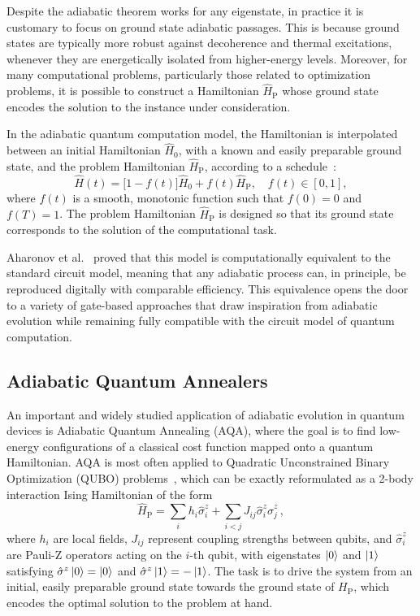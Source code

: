 Despite the adiabatic theorem works for any eigenstate, in practice it is customary to focus on ground state adiabatic passages. This is because ground states are typically more robust against decoherence and thermal excitations, whenever they are energetically isolated from higher-energy levels. Moreover, for many computational problems, particularly those related to optimization problems, it is possible to construct a Hamiltonian $\hat{H}_\mathrm{P}$ whose ground state encodes the solution to the instance under consideration.

In the adiabatic quantum computation model, the Hamiltonian is interpolated between an initial Hamiltonian $\hat{H}_0$, with a known and easily preparable ground state, and the problem Hamiltonian $\hat{H}_\mathrm{P}$, according to a schedule~\cite{albash_adiabatic_2018}:
\begin{equation}
    \hat{H}(t) = \big[1 - f(t)\big] \hat{H}_0 + f(t) \hat{H}_\mathrm{P}, \quad f(t) \in [0,1],
    \label{eq:adiabatic_passage}
\end{equation}
where $f(t)$ is a smooth, monotonic function such that $f(0)=0$ and $f(T)=1$. The problem Hamiltonian $\hat{H}_\mathrm{P}$ is designed so that its ground state corresponds to the solution of the computational task.

Aharonov et al.~\cite{aharonov_adiabatic_2004} proved that this model is computationally equivalent to the standard circuit model, meaning that any adiabatic process can, in principle, be reproduced digitally with comparable efficiency. This equivalence opens the door to a variety of gate-based approaches that draw inspiration from adiabatic evolution while remaining fully compatible with the circuit model of quantum computation.

\subsection{Adiabatic Quantum Annealers}
An important and widely studied application of adiabatic evolution in quantum devices is Adiabatic Quantum Annealing (AQA), where the goal is to find low-energy configurations of a classical cost function mapped onto a quantum Hamiltonian. AQA is most often applied to Quadratic Unconstrained Binary Optimization (QUBO) problems~\cite{kadowaki_quantum_1998}, which can be exactly reformulated as a 2-body interaction Ising Hamiltonian of the form~\cite{albash_adiabatic_2018}
\begin{equation}
    \hat{H}_\mathrm{P} = \sum_i h_i \hat{\sigma}_i^z + \sum_{i<j} J_{ij} \hat{\sigma}_i^z \hat{\sigma}_j^z\,,
    \label{eq:ising_hamiltonian}
\end{equation}
where $h_i$ are local fields, $J_{ij}$ represent coupling strengths between qubits, and $\hat{\sigma}_i^z$ are Pauli-Z operators acting on the $i$-th qubit, with eigenstates $\ket{0}$ and $\ket{1}$ satisfying $\hat{\sigma}^z \ket{0} = \ket{0}$ and $\hat{\sigma}^z \ket{1} = -\ket{1}$. The task is to drive the system from an initial, easily preparable ground state towards the ground state of $H_\mathrm{P}$, which encodes the optimal solution to the problem at hand.

